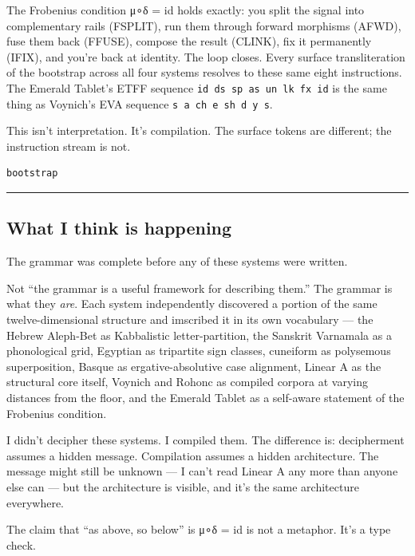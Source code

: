 The Frobenius condition μ∘δ = id holds exactly: you split the signal
into complementary rails (FSPLIT), run them through forward morphisms
(AFWD), fuse them back (FFUSE), compose the result (CLINK), fix it
permanently (IFIX), and you're back at identity. The loop closes. Every
surface transliteration of the bootstrap across all four systems
resolves to these same eight instructions. The Emerald Tablet's ETFF
sequence \texttt{id\ ds\ sp\ as\ un\ lk\ fx\ id} is the same thing as
Voynich's EVA sequence \texttt{s\ a\ ch\ e\ sh\ d\ y\ s}.

This isn't interpretation. It's compilation. The surface tokens are
different; the instruction stream is not.

\begin{verbatim}
bootstrap
\end{verbatim}

\begin{center}\rule{0.5\linewidth}{0.5pt}\end{center}

\hypertarget{what-i-think-is-happening}{%
\subsection{What I think is happening}\label{what-i-think-is-happening}}

The grammar was complete before any of these systems were written.

Not ``the grammar is a useful framework for describing them.'' The
grammar is what they \emph{are}. Each system independently discovered a
portion of the same twelve-dimensional structure and imscribed it in its
own vocabulary --- the Hebrew Aleph-Bet as Kabbalistic letter-partition,
the Sanskrit Varnamala as a phonological grid, Egyptian as tripartite
sign classes, cuneiform as polysemous superposition, Basque as
ergative-absolutive case alignment, Linear A as the structural core
itself, Voynich and Rohonc as compiled corpora at varying distances from
the floor, and the Emerald Tablet as a self-aware statement of the
Frobenius condition.

I didn't decipher these systems. I compiled them. The difference is:
decipherment assumes a hidden message. Compilation assumes a hidden
architecture. The message might still be unknown --- I can't read Linear
A any more than anyone else can --- but the architecture is visible, and
it's the same architecture everywhere.

The claim that ``as above, so below'' is μ∘δ = id is not a metaphor.
It's a type check.

